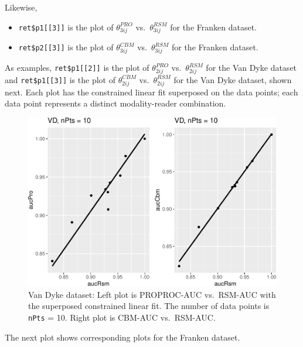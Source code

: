\documentclass[
]{book}
\providecommand{\tightlist}{%
  \setlength{\itemsep}{0pt}\setlength{\parskip}{0pt}}
\begin{document}
Likewise,

\begin{itemize}
\tightlist
\item
  \texttt{ret\$p1{[}{[}3{]}{]}} is the plot of \(\theta^{PRO}_{3ij}\) vs.~\(\theta^{RSM}_{3ij}\) for the Franken dataset.
\item
  \texttt{ret\$p2{[}{[}3{]}{]}} is the plot of \(\theta^{CBM}_{3ij}\) vs.~\(\theta^{RSM}_{3ij}\) for the Franken dataset.
\end{itemize}

As examples, \texttt{ret\$p1{[}{[}2{]}{]}} is the plot of \(\theta^{PRO}_{2ij}\) vs.~\(\theta^{RSM}_{2ij}\) for the Van Dyke dataset and \texttt{ret\$p1{[}{[}3{]}{]}} is the plot of \(\theta^{CBM}_{2ij}\) vs.~\(\theta^{RSM}_{2ij}\) for the Van Dyke dataset, shown next. Each plot has the constrained linear fit superposed on the data points; each data point represents a distinct modality-reader combination.

\begin{figure}
\centering
\includegraphics{19b-rsm-3-fits_files/figure-latex/rsm-3-fits-plots-2-1.pdf}
\caption{\label{fig:rsm-3-fits-plots-2}Van Dyke dataset: Left plot is PROPROC-AUC vs.~RSM-AUC with the superposed constrained linear fit. The number of data points is \texttt{nPts} = 10. Right plot is CBM-AUC vs.~RSM-AUC.}
\end{figure}

The next plot shows corresponding plots for the Franken dataset.
\end{document}
